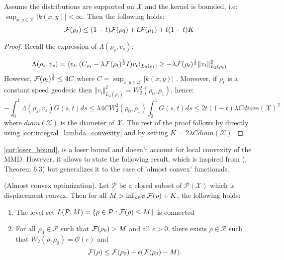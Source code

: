 %
\begin{corollary}
\label{cor:loser_bound}Assume the distributions are supported on
$\mathcal{X}$ and the kernel is bounded, i.e: $\sup_{x,y\in\mathcal{X}}\vert k(x,y)\vert<\infty$.
Then the following holds:
\begin{equation}
{{\mathcal F}}(\rho_{t})\leq(1-t){{\mathcal F}}(\rho_{0})+t{{\mathcal F}}(\rho_{1})+t(1-t)K
\end{equation}
\end{corollary}
%
\begin{proof}
Recall the expression of $\Lambda(\rho_{s},v_{s}):$

\[
\Lambda(\rho_{s},v_{s})=\langle v_{t},(C_{\rho_{t}}-\lambda {{\mathcal F}}(\rho_{t})^\frac{1}{2} I)v_{t}\rangle_{L_{2}(\rho_{t})}\geq-\lambda {{\mathcal F}}(\rho_{t})^\frac{1}{2}\Vert v_{t}\Vert_{L_{2}(\rho_{t})}^{2}
\]
However, ${{\mathcal F}}(\rho_{t})^\frac{1}{2}\leq4C$ where $C=\sup_{x,y\in\mathcal{X}}\vert k(x,y)\vert$
. Moreover, if $\rho_{t}$ is a constant speed geodesic then $\Vert v_{t}\Vert_{L_{2}(\rho_{t})}^{2}=W_{2}^{2}(\rho_{0},\rho_{1})$,
hence: 
\[
-\int_{0}^{1}\Lambda(\rho_{s},v_{s})G(s,t)ds\leq\lambda 4CW_{2}^{2}(\rho_{0},\rho_{1})\int_{0}^{1}G(s,t)ds\leq2t(1-t)\lambda Cdiam(\mathcal{X})^{2}
\]
where $diam(\mathcal{X})$ is the diameter of $\mathcal{X}$. The rest of the proof follows by directly using \cref{cor:integral_lambda_convexity}
and by setting $K=2\lambda Cdiam(\mathcal{X})$.
\end{proof}
%
\cref{cor:loser_bound}, is a loser bound and doesn't account for local
convexity of the MMD. However, it allows to state the following result,
which is inspired from (\cite{Bottou:2017}, Theorem 6.3) but generalizes
it to the case of 'almost convex' functionals.
\begin{proposition}
\label{prop:almost_convex_optimization}
(Almost convex optimization). Let $\mathcal{P}$ be a closed subset
of $\mathcal{P}(\mathcal{X})$ which is displacement convex. Then
for all $M>\inf_{\rho\in\mathcal{P}}{{\mathcal F}}(\rho)+K$, the following
holds:
\end{proposition}
\begin{enumerate}
\item The level set $L(\mathcal{P},M)=\{\rho\in\mathcal{P}:{{\mathcal F}}(\rho)\leq M\}$
is connected
\item For all $\rho_{0}\in\mathcal{P}$ such that ${{\mathcal F}}(\rho_0)>M$
and all $\epsilon>0$, there exists $\rho\in\mathcal{P}$ such that
$W_{2}(\rho,\rho_{0})=\mathcal{O}(\epsilon)$ and
\[
{{\mathcal F}}(\rho)\leq {{\mathcal F}}(\rho_{0})-\epsilon({{\mathcal F}}(\rho_{0})-M).
\]
\end{enumerate}
